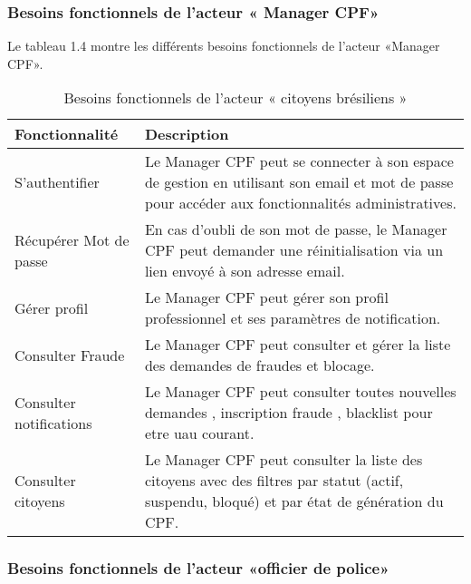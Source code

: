 \subsubsection{Besoins fonctionnels de l'acteur « Manager CPF»}

Le tableau 1.4 montre les différents besoins fonctionnels de l'acteur «Manager CPF».
\begin{longtable}
{| >{\centering\arraybackslash}p{4.2cm} | >{\arraybackslash}p{12.5cm} |}
\caption{\centering Besoins fonctionnels de l'acteur « citoyens brésiliens »} \label{tab:besoins-citoyens} \\
\hline
\rowcolor{gray!30} \textbf{Fonctionnalité} & \textbf{Description} \\
\hline
\endfirsthead
\endhead

\hline
\endfoot

\hline
\endlastfoot

S'authentifier & Le Manager CPF peut se connecter à son espace de gestion en utilisant son email et mot de passe pour accéder aux fonctionnalités administratives. \\
\hline
Récupérer Mot de passe & En cas d'oubli de son mot de passe, le Manager CPF peut demander une réinitialisation via un lien envoyé à son adresse email. \\
\hline
Gérer profil & Le Manager CPF peut gérer son profil professionnel et ses paramètres de notification. \\
\hline
Consulter Fraude & Le Manager CPF peut consulter et gérer la liste des demandes de fraudes et blocage. \\
\hline
Consulter notifications & Le Manager CPF peut consulter toutes nouvelles demandes , inscription
fraude , blacklist pour etre uau courant. \\
\hline
Consulter citoyens & Le Manager CPF peut consulter la liste des citoyens avec des filtres par statut (actif, suspendu, bloqué) et par état de génération du CPF. \\
\hline

\end{longtable}



\subsubsection{Besoins fonctionnels de l'acteur «officier de police»}

